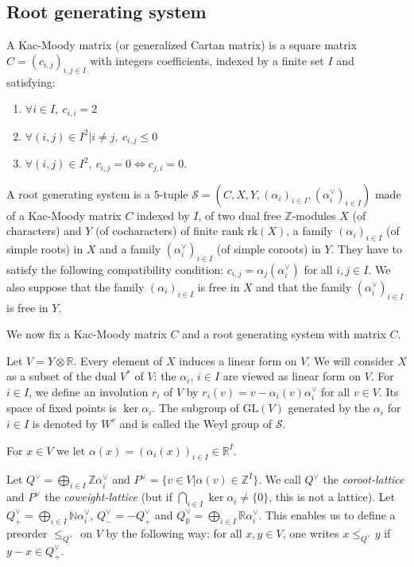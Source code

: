 \documentclass[12pt]{article}
\theoremstyle{plain}
\theoremstyle{definition}
\newcommand{\R}{\mathbb{R}}
\newcommand{\N}{\mathbb{N}}
\newcommand{\Z}{\mathbb{Z}}
\begin{document}
\subsection{Root generating system}
A Kac-Moody matrix (or generalized Cartan matrix) is a square matrix $C=(c_{i,j})_{i,j\in I}$ with integers coefficients, indexed by  a finite set $I$ and satisfying: 
\begin{enumerate}
\item $\forall i\in I,\ c_{i,i}=2$

\item $\forall (i,j)\in I^2|i \neq j,\ c_{i,j}\leq 0$

\item $\forall (i,j)\in I^2,\ c_{i,j}=0 \Leftrightarrow c_{j,i}=0$.
\end{enumerate}

A root generating system is a $5$-tuple $\mathcal{S}=(C,X,Y,(\alpha_i)_{i\in I},(\alpha_i^\vee)_{i\in I})$ made of a Kac-Moody matrix $C$ indexed by $I$, of two dual free $\Z$-modules $X$ (of characters) and $Y$ (of cocharacters) of finite rank $\mathrm{rk}(X)$, a family $(\alpha_i)_{i\in I}$ (of simple roots) in $X$ and a family $(\alpha_i^\vee)_{i\in I}$ (of simple coroots) in $Y$. They have to satisfy the following compatibility condition: $c_{i,j}=\alpha_j(\alpha_i^\vee)$ for all $i,j\in I$. We also suppose that the family $(\alpha_i)_{i\in I}$ is free in $X$ and that the family $(\alpha_i^\vee)_{i\in I}$ is free in $Y$.



 We now fix a Kac-Moody matrix $C$ and a root generating system with matrix $C$.



Let $V=Y\otimes \R$. Every element of $X$ induces a linear form on $V$. We will consider $X$ as a subset of the dual $V^*$ of $V$: the $\alpha_i$, $i\in I$ are viewed as linear form on $V$. For $i\in I$, we define an involution $r_i$ of $V$ by $r_i(v)=v-\alpha_i(v)\alpha_i^\vee$ for all $v\in V$. Its space of fixed points is $\ker \alpha_i$. The subgroup of $\mathrm{GL}(V)$ generated by the $\alpha_i$ for $i\in I$ is denoted by $W^v$ and is called the Weyl group of $\mathcal S$.


For $x\in V$ we let $\alpha(x)=(\alpha_i(x))_{i\in I}\in \R^I$.

Let  $Q^\vee=\bigoplus_{i\in I}\Z\alpha_i^\vee$ and $P^\vee=\{v\in V |\alpha(v)\in \Z^I\}$. We call  $Q^\vee$ the \textit{coroot-lattice} and $P^\vee$ the \textit{coweight-lattice} (but if $\bigcap_{i\in I}\ker \alpha_i\neq \{0\}$, this is not a lattice). Let $Q_+^\vee=\bigoplus_{i\in I}\N \alpha_i^\vee$, $Q^\vee_-=-Q^\vee_+$ and $Q^\vee_{\mathbb{R}}=\bigoplus_{i\in I}\R\alpha_i^\vee$. This enables us to define a preorder $\leq_{Q^\vee}$ on $V$ by the following way: for all $x,y\in V$, one writes $x\leq_{Q^\vee}y$ if $y-x\in Q^\vee_+$. 
\end{document}
